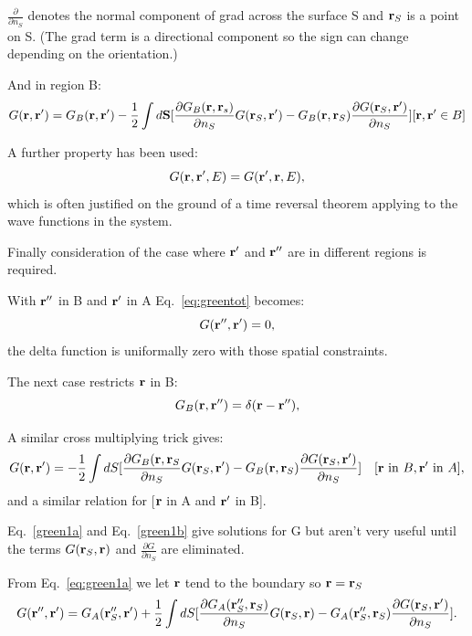 $\frac{\partial}{\partial n_{S}}$ denotes the normal component of grad across
the surface S and ${\bf r}_{S}$ is a point on S. (The grad term is a directional component
so the sign can change depending on the orientation.)

And in region B:
%
\begin{equation}
\label{eq:green1b}
G({\bf r},{\bf r}') = G_{B}({\bf r},{\bf r}') - \frac{1}{2} \int d\mathbf{S} 
[\frac{\partial G_{B}({\bf r},{\bf r}_{s})}{\partial n_{S}}G({\bf r}_{S},{\bf r}')
- G_{B}({\bf r},{\bf r}_{S})\frac{\partial G({\bf r}_{S},{\bf r}')}{\partial n_{S}}] [{\bf r}, {\bf r}' \in B]
\end{equation}
%

A further property has been used:
%
\begin{equation}
G({\bf r},{\bf r}',E) = G({\bf r}',{\bf r},E),
\end{equation}
%
which is often justified on the ground of a time reversal theorem applying 
to the wave functions in the system.

Finally consideration of the case where ${\bf r}'$ and ${\bf r}''$ are in different regions is required.

With ${\bf r}''$ in B and ${\bf r}'$ in A Eq.~\ref{eq:greentot} becomes:
%
\begin{equation}
[-\frac{1}{2}\nabla^{2}_{\r''} + V(\r'') - E]G(\r'',\r') = 0,
\end{equation}
%
the delta function is uniformally zero with those spatial constraints.

The next case restricts ${\bf r}$ in B:
%
\begin{equation}
[-\frac{1}{2}\nabla^{2}_{\r''} + V(\r'') - E]G_B(\r,\r'')= \delta(\r-\r''),
\end{equation}
%

A similar cross multiplying trick gives:
%
\begin{equation}
\label{eq:green1c}
G({\bf r},{\bf r}') = -\frac{1}{2} \int dS[\frac{\partial G_{B}({\bf r}, {\bf r}_{S}}{\partial n_{S}} G({\bf r}_{S},{\bf r}')
- G_{B}({\bf r}, {\bf r}_{S})\frac{\partial G({\bf r}_{S},{\bf r}')}{\partial n_{S}}] \quad [{\bf r}~{\rm in}~B, {\bf r}'~{\rm in}~A],
\end{equation}
%
and a similar relation for [${\bf r}$ in A and ${\bf r}'$ in B].

Eq.~\ref{green1a} and Eq.~\ref{green1b} give solutions for G but 
aren't very useful until the terms $G({\bf r}_S,{\bf r})$ and 
$\frac{\partial G}{\partial n_{S}}$ are eliminated.

From Eq.~\ref{eq:green1a} we let ${\bf r}$ tend to the boundary so ${\bf r} = {\bf r}_{S}$
%
\begin{equation}
\label{eq:greensys1}
G({\bf r}'',{\bf r}') = G_{A}({\bf r}''_{S}, {\bf r}') + \frac{1}{2} \int d{S}
[\frac{\partial G_{A}({\bf r}''_{S}, {\bf r}_{S})}{\partial n_{S}} G({\bf r}_{S},{\bf r}) - 
G_{A}({\bf r}''_{S},{\bf r}_{S})\frac{\partial{G({\bf r}_{S}, {\bf r}')}}{\partial n_{S}}].
\end{equation}
%

